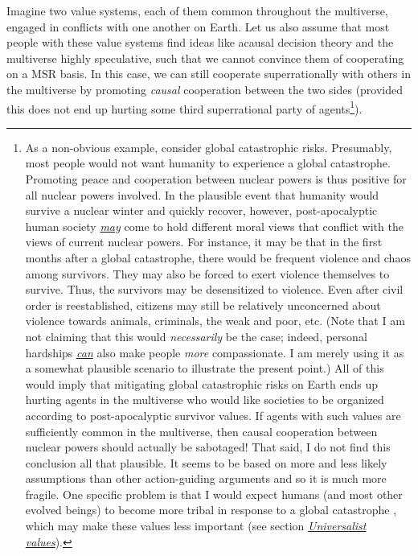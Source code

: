 Imagine two value systems, each of them common throughout the
multiverse, engaged in conflicts with one another on Earth. Let us also
assume that most people with these value systems find ideas like acausal
decision theory and the multiverse highly speculative, such that we
cannot convince them of cooperating on a MSR basis. In this case, we can
still cooperate superrationally with others in the multiverse by
promoting \emph{causal} cooperation between the two sides (provided this
does not end up hurting some third superrational party of
agents\footnote{As a non-obvious example, consider global catastrophic
  risks. Presumably, most people would not want humanity to experience a
  global catastrophe. Promoting peace and cooperation between nuclear
  powers is thus positive for all nuclear powers involved. In the
  plausible event that humanity would survive a nuclear winter and
  quickly recover, however, post-apocalyptic human society
  \href{https://foundational-research.org/how-would-catastrophic-risks-affect-prospects-for-compromise/\#Other_costs_to_catastrophes}{\emph{may}}
  come to hold different moral views that conflict with the views of
  current nuclear powers. For instance, it may be that in the first
  months after a global catastrophe, there would be frequent violence
  and chaos among survivors. They may also be forced to exert violence
  themselves to survive. Thus, the survivors may be desensitized to
  violence. Even after civil order is reestablished, citizens may still
  be relatively unconcerned about violence towards animals, criminals,
  the weak and poor, etc. (Note that I am not claiming that this would
  \emph{necessarily} be the case; indeed, personal hardships
  \href{http://reducing-suffering.org/how-important-is-experiencing-suffering-for-caring-about-suffering/}{\emph{can}}
  also make people \emph{more} compassionate. I am merely using it as a
  somewhat plausible scenario to illustrate the present point.) All of
  this would imply that mitigating global catastrophic risks on Earth
  ends up hurting agents in the multiverse who would like societies to
  be organized according to post-apocalyptic survivor values. If agents
  with such values are sufficiently common in the multiverse, then
  causal cooperation between nuclear powers should actually be
  sabotaged! That said, I do not find this conclusion all that
  plausible. It seems to be based on more and less likely assumptions
  than other action-guiding arguments and so it is much more fragile.
  One specific problem is that I would expect humans (and most other
  evolved beings) to become more tribal in response to a global
  catastrophe \parencite{Henrich2015-xe}, which may make
  these values less important (see section
  \protect\hyperlink{universalist-values}{\emph{Universalist
  values}}).}).

